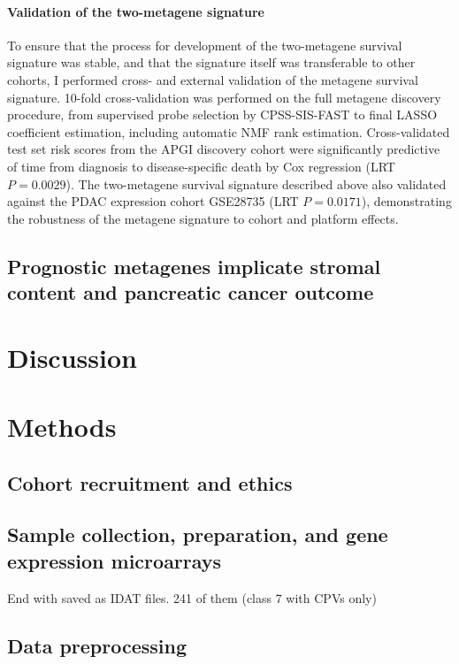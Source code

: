 \documentclass[dissertation.tex]{subfiles}
\begin{document}
\paragraph{Validation of the two-metagene signature}
To ensure that the process for development of the two-metagene survival signature was stable, and that the signature itself was transferable to other cohorts, I performed cross- and external validation of the metagene survival signature.  10-fold cross-validation was performed on the full metagene discovery procedure, from supervised probe selection by \gls{CPSS}-\gls{SIS}-\gls{FAST} to final \gls{LASSO} coefficient estimation, including automatic \gls{NMF} rank estimation.  Cross-validated test set risk scores from the \gls{APGI} discovery cohort were significantly predictive of time from diagnosis to disease-specific death by Cox regression (LRT $P = 0.0029$).  The two-metagene survival signature described above also validated against the \gls{PDAC} expression cohort GSE28735 \cite{Zhang2013} (LRT $P = 0.0171$), demonstrating the robustness of the metagene signature to cohort and platform effects.  

\subsection{Prognostic metagenes implicate stromal content and  pancreatic cancer outcome}

\section{Discussion}

\section{Methods}
\subsection{Cohort recruitment and ethics}

\subsection{Sample collection, preparation, and gene expression microarrays}
\mpfatal{}
End with saved as \gls{IDAT} files.  241 of them (class 7 with CPVs only)

\subsection{Data preprocessing}
\end{document}
